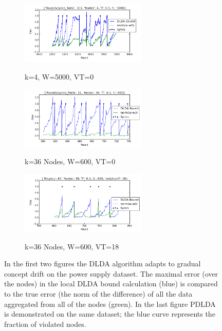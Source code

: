 \documentclass[11pt,twocolumn,varwidth=true,a4paper,fleqn]{article}
\begin{document}
\begin{figure}[h!]

  
  \begin{subfigure}
  \centering
  \includegraphics[width=6cm]{PowerSupply/4nodes.png} 
  \label{PowerSupplyFigure1}
  \caption{k=4, W=5000, VT=0}
  \end{subfigure}
  
  \begin{subfigure}
  \centering
  \includegraphics[width=6cm]{PowerSupply/36nodes.png}
  \label{PowerSupplyFigure2}
  \caption{k=36 Nodes, W=600, VT=0}
  \end{subfigure}
  
  \begin{subfigure}  
  \centering
  \includegraphics[width=6cm]{PowerSupply/36nodesProb.png}
  \label{PowerSupplyFigure3}
  \caption{k=36 Nodes, W=600, VT=18}
  \end{subfigure}
  \caption{In the first two figures the DLDA algorithm adapts
  to gradual concept drift on the power supply dataset.  
  The maximal error (over the nodes) in the 
  local DLDA bound calculation (blue) is compared to the true
error (the norm of the difference) of all the data aggregated from
all of the nodes (green). In the last figure PDLDA
is demonstrated on the same dataset; the blue curve represents the
fraction of violated nodes.}
\label{PowerSupplyFigures}
\end{figure}
\end{document}
